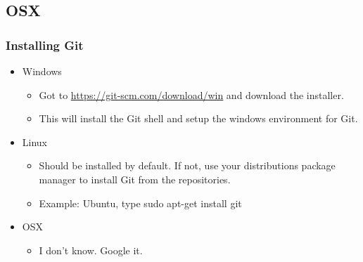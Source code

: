 \documentclass{beamer}
\begin{document}
\subsection{OSX}
\begin{frame}
    \frametitle{Installing Git}
    \begin{itemize}

        \item{Windows}
        \begin{itemize}
            \item{Got to \url{https://git-scm.com/download/win} and download the installer.}
            \item{This will install the Git shell and setup the windows environment for Git.}
        \end{itemize}

        \item{Linux}
        \begin{itemize}
                \item{Should be installed by default. If not, use your distributions package manager to install Git from the repositories.}
                \item{Example: Ubuntu, type sudo apt-get install git}
        \end{itemize}

        \item{OSX}
        \begin{itemize}
            \item{I don't know. Google it.}
        \end{itemize}

    \end{itemize}
\end{frame} 
\end{document}
